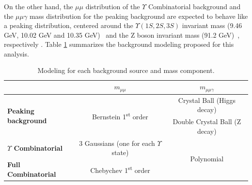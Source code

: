 On the other hand, the $\mu\mu$ distribution of the $\Upsilon$ Combinatorial background and the $\mu\mu\gamma$ mass distribution for the peaking background are expected to behave like a peaking distribution, centered around the $\Upsilon(1S, 2S, 3S)$ invariant mass (9.46 GeV, 10.02 GeV and 10.35 GeV)~\cite{pdg_2020} and the Z boson invariant mass (91.2 GeV)~\cite{pdg_2020}, respectively . Table \ref{tab:BckgModeling_Z} summarizes the background modeling proposed for this analysis.




\begin{table}[ht]
\begin{center}
\caption{Modeling for each background source and mass component.}
\begin{tabular}{l|c|c}
                         & $m_{\mu\mu}$                                          & $m_{\mu\mu\gamma}$       \\ \hline 
\multirow{2}{*}{\textbf{Peaking background} }      & \multirow{2}{*}{Bernstein 1\textsuperscript{st} order}                 & Crystal Ball (Higgs decay)    \\ 
                                  &                       & Double Crystal Ball (Z decay)    \\ \hline
\textbf{$\Upsilon$ Combinatorial} & 3 Gaussians (one for each $\Upsilon$ state) & \multirow{2}{*}{Polynomial}  \\ \cline{1-2}
\textbf{Full Combinatorial}       & Chebychev 1\textsuperscript{st} order                 &                          \\ 
\end{tabular}

\label{tab:BckgModeling_Z}
\end{center}
\end{table}



